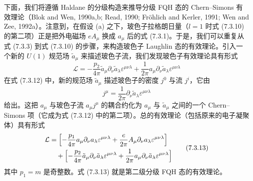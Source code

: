 下面，我们将遵循 Haldane 的分级构造来推导分级 FQH 态的 Chern--Simons 有效理论（Blok and Wen, 1990a,b; Read, 1990; Fr\"{o}hlich and Kerler, 1991; Wen and Zee, 1992a）。注意到，在假设 (a) 之下，玻色子拉格朗日量（$l=1$ 时式 (7.3.10) 的第二项）正是把外电磁场 $eA_\mu$ 换成 $a_\mu$ 后的式 (7.3.1)。于是，我们可以重复从式 (7.3.3) 到式 (7.3.10) 的步骤，来构造玻色子 Laughlin 态的有效理论。引入一个新的 $U(1)$ 规范场 $\tilde{a}_\mu$ 来描述玻色子流，我们发现玻色子有效理论具有形式
\begin{equation*}
\mathcal{L}=-\frac{p_2}{4\pi}\tilde{a}_\mu\partial_\nu\tilde{a}_\lambda\varepsilon^{\mu\nu\lambda}+\frac{1}{2\pi}a_\mu\partial_\nu\tilde{a}_\lambda\varepsilon^{\mu\nu\lambda}
\tag{7.3.12}
\end{equation*}
在式 (7.3.12) 中，新的规范场 $\tilde{a}_\mu$ 描述玻色子的密度 $j^0$ 与流 $j^i$，它由
\begin{equation*}
j^\mu=\frac{1}{2\pi}\partial_\nu\tilde{a}_\lambda\varepsilon^{\mu\nu\lambda}
\end{equation*}
给出。这把 $a_\mu$ 与玻色子流 $a_\mu j^\mu$ 的耦合约化为 $a_\mu$ 与 $\tilde{a}_\mu$ 之间的一个 Chern--Simons 项（它成为式 (7.3.12) 中的第二项）。总的有效理论（包括原来的电子凝聚体）具有形式
\begin{equation*}
\begin{aligned}
\mathcal{L}&=\Bigl[-\frac{p_1}{4\pi}a_\mu\partial_\nu a_\lambda\varepsilon^{\mu\nu\lambda}+\frac{e}{2\pi}A_\mu\partial_\nu a_\lambda\varepsilon^{\mu\nu\lambda}\Bigr]\\
&\quad+\Bigl[-\frac{p_2}{4\pi}\tilde{a}_\mu\partial_\nu\tilde{a}_\lambda\varepsilon^{\mu\nu\lambda}+\frac{1}{2\pi}a_\mu\partial_\nu\tilde{a}_\lambda\varepsilon^{\mu\nu\lambda}\Bigr]
\end{aligned}
\tag{7.3.13}
\end{equation*}
其中 $p_1=m$ 是奇整数。式 (7.3.13) 就是第二级分级 FQH 态的有效理论。

